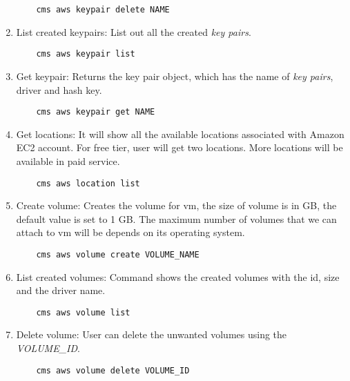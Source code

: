 \documentclass[9pt,twocolumn,twoside]{../../styles/osajnl}
\begin{document}
\begin{enumerate}
    \begin{verbatim}
    cms aws keypair delete NAME
    \end{verbatim}
    
    \item List created keypairs: List out all the created \textit{key pairs}.
    
    \begin{verbatim}
    cms aws keypair list
    \end{verbatim}
    
    \item Get keypair: Returns the key pair object, which has the name of \textit{key pairs}, driver and hash key.
    
    \begin{verbatim}
    cms aws keypair get NAME
    \end{verbatim}
    
    
    \item Get locations: It will show all the available locations associated with Amazon EC2 account. For free tier, user will get two locations. More locations will be available in paid service.
    
    \begin{verbatim}
    cms aws location list
    \end{verbatim}
    
    \item Create volume: Creates the volume for vm, the size of volume is in GB, the default value is set to 1 GB. The maximum number of volumes that we can attach to vm will be depends on its operating system.
    
    \begin{verbatim}
    cms aws volume create VOLUME_NAME
    \end{verbatim}
    
     
    \item List created volumes: Command shows the created volumes with the id, size and the driver name.
    
    \begin{verbatim}
    cms aws volume list
    \end{verbatim}
    
    \item Delete volume: User can delete the unwanted volumes using the \textit{VOLUME\_ID}.
    
    \begin{verbatim}
    cms aws volume delete VOLUME_ID
    \end{verbatim}
    
    
    
\end{enumerate}
\end{document}
